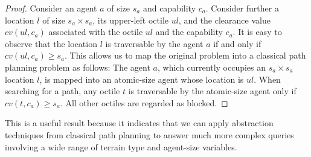 \begin{proof}
Consider an agent $a$ of size $s_a$ and capability $c_a$.
Consider further a location $l$ of size $s_a \times s_a$, its upper-left octile $\textit{ul}$,
and the clearance value $\textit{cv}(\textit{ul}, c_a)$ associated with the octile $\textit{ul}$ and the capability $c_a$.
It is easy to observe that the location $l$ is traversable by the agent $a$
if and only if $\textit{cv}(\textit{ul}, c_a) \geq s_a$.
This allows us to map the original problem into a classical path planning problem as follows:
The agent $a$, which currently occupies an $s_a \times s_a$ location $l$, is mapped into an atomic-size agent whose location is $ul$. 
When searching for a path, any octile $t$ is traversable by the atomic-size agent only if $\textit{cv}(t, c_a) \geq s_a$.
All other octiles are regarded as blocked.
\end{proof}
This is a useful result because it indicates that we can apply abstraction techniques from classical path planning to answer much more complex queries involving a wide range of terrain type and agent-size variables. 
%
